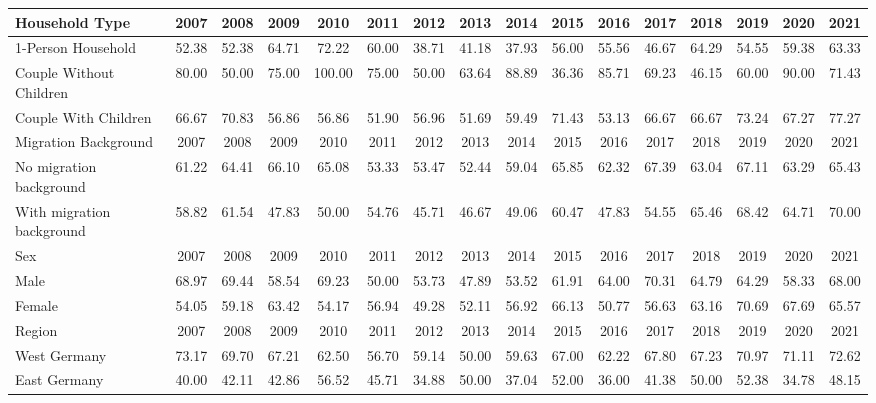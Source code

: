 \begin{landscape}
\begin{table}[htbp]
\centering
\label{tab:nontakeup_hgtyp_migback_sex_east_siblings}
\begin{tabular}{lccccccccccccccc}
\toprule
Household Type & 2007 & 2008 & 2009 & 2010 & 2011 & 2012 & 2013 & 2014 & 2015 & 2016 & 2017 & 2018 & 2019 & 2020 & 2021 \\
\midrule
1-Person Household      & 52.38 & 52.38 & 64.71 & 72.22 & 60.00 & 38.71 & 41.18 & 37.93 & 56.00 & 55.56 & 46.67 & 64.29 & 54.55 & 59.38 & 63.33 \\
Couple Without Children & 80.00 & 50.00 & 75.00 & 100.00 & 75.00 & 50.00 & 63.64 & 88.89 & 36.36 & 85.71 & 69.23 & 46.15 & 60.00 & 90.00 & 71.43 \\
Couple With Children    & 66.67 & 70.83 & 56.86 & 56.86 & 51.90 & 56.96 & 51.69 & 59.49 & 71.43 & 53.13 & 66.67 & 66.67 & 73.24 & 67.27 & 77.27 \\
\midrule
Migration Background & 2007 & 2008 & 2009 & 2010 & 2011 & 2012 & 2013 & 2014 & 2015 & 2016 & 2017 & 2018 & 2019 & 2020 & 2021 \\
\midrule
No migration background   & 61.22 & 64.41 & 66.10 & 65.08 & 53.33 & 53.47 & 52.44 & 59.04 & 65.85 & 62.32 & 67.39 & 63.04 & 67.11 & 63.29 & 65.43 \\
With migration background & 58.82 & 61.54 & 47.83 & 50.00 & 54.76 & 45.71 & 46.67 & 49.06 & 60.47 & 47.83 & 54.55 & 65.46 & 68.42 & 64.71 & 70.00 \\
\midrule
Sex & 2007 & 2008 & 2009 & 2010 & 2011 & 2012 & 2013 & 2014 & 2015 & 2016 & 2017 & 2018 & 2019 & 2020 & 2021 \\
\midrule
Male   & 68.97 & 69.44 & 58.54 & 69.23 & 50.00 & 53.73 & 47.89 & 53.52 & 61.91 & 64.00 & 70.31 & 64.79 & 64.29 & 58.33 & 68.00 \\
Female & 54.05 & 59.18 & 63.42 & 54.17 & 56.94 & 49.28 & 52.11 & 56.92 & 66.13 & 50.77 & 56.63 & 63.16 & 70.69 & 67.69 & 65.57 \\
\midrule
Region & 2007 & 2008 & 2009 & 2010 & 2011 & 2012 & 2013 & 2014 & 2015 & 2016 & 2017 & 2018 & 2019 & 2020 & 2021 \\
\midrule
West Germany & 73.17 & 69.70 & 67.21 & 62.50 & 56.70 & 59.14 & 50.00 & 59.63 & 67.00 & 62.22 & 67.80 & 67.23 & 70.97 & 71.11 & 72.62 \\
East Germany & 40.00 & 42.11 & 42.86 & 56.52 & 45.71 & 34.88 & 50.00 & 37.04 & 52.00 & 36.00 & 41.38 & 50.00 & 52.38 & 34.78 & 48.15 \\

\end{tabular}
\end{table}
\end{landscape}
